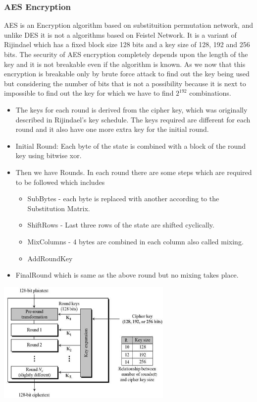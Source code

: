 \documentclass[conference]{IEEEtran}
\begin{document}
\subsubsection{AES Encryption}
AES is an Encryption algorithm based on substituition permutation network, and unlike DES it is not a algorithms based on Feistel Network. It is a variant of Rijindael which has a fixed block size 128 bits and a key size of 128, 192 and 	256 bits.
\linebreak
The security of AES encryption completely depends upon the length of the key and it is not breakable even if the algorithm is known. As we now that this encryption is breakable only by brute force attack to find out the key being used but considering the number of bits that is not a possibility because it is next to impossible to find out the key for which we have to find \(2^{192}\) combinations.
\begin{itemize}
  \item The keys for each round is derived from the cipher key, which was originally described in Rijindael's key schedule. The keys required are different for each round and it also have one more extra key for the initial round.
  \item Initial Round: Each byte of the state is combined with a block of the round key using bitwise xor.
  \item Then we have Rounds. In each round there are some steps which are required to be followed which includes
  \begin{itemize}
  \item SubBytes - each byte is replaced with another according to the Substitution Matrix.
  \item ShiftRows - Last three rows of the state are shifted cyclically.
  \item MixColumns - 4 bytes are combined in each column also called mixing.
  \item AddRoundKey
  \end{itemize}
  \item FinalRound which is same as the above round but no mixing takes place.
\end{itemize}

\includegraphics[width=8.5cm]{aes_structure}
\end{document}
